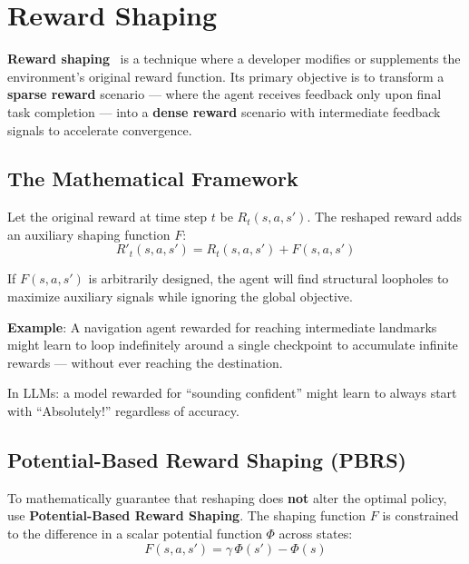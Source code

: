 \section{Reward Shaping}
\label{reward-shaping}

\textbf{Reward shaping}~\cite{ng1999policy} is a technique where a developer modifies or supplements the environment’s original reward function. Its primary objective is to transform a \textbf{sparse reward} scenario --- where the agent receives feedback only upon final task completion --- into a \textbf{dense reward} scenario with intermediate feedback signals to accelerate convergence.

\subsection{The Mathematical Framework}
\label{the-mathematical-framework}

Let the original reward at time step $t$ be $R_t(s, a, s')$. The reshaped reward adds an auxiliary shaping function $F$: 
\begin{equation}
\boxed{R'_t(s, a, s') = R_t(s, a, s') + F(s, a, s')}
\end{equation}

\begin{warningbox}
If $F(s, a, s')$ is arbitrarily designed, the agent will find structural loopholes to maximize auxiliary signals while ignoring the global objective.

\textbf{Example}: A navigation agent rewarded for reaching intermediate landmarks might learn to loop indefinitely around a single checkpoint to accumulate infinite rewards --- without ever reaching the destination.

In LLMs: a model rewarded for ``sounding confident'' might learn to always start with ``Absolutely!'' regardless of accuracy.
\end{warningbox}

\subsection{Potential-Based Reward Shaping (PBRS)}
\label{potential-based-reward-shaping-pbrs}

To mathematically guarantee that reshaping does \textbf{not} alter the optimal policy, use \textbf{Potential-Based Reward Shaping}. The shaping function $F$ is constrained to the difference in a scalar potential function $\Phi$ across states: 
\begin{equation}
\boxed{F(s, a, s') = \gamma\, \Phi(s') - \Phi(s)}
\end{equation}

